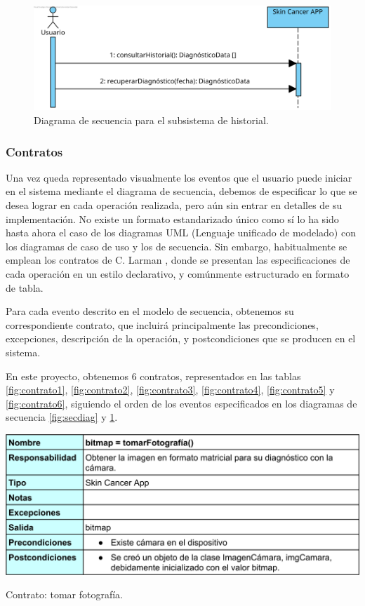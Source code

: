 \begin{figure}[H]
	\centering
	\includegraphics[scale = 1]{imagenes/DiagramaSecuenciaHistorial.png}
	\caption{Diagrama de secuencia para el subsistema de historial.}
	\label{fig:sechistorial}
\end{figure}

 \subsubsection{Contratos}
 
 Una vez queda representado visualmente los eventos que el usuario puede iniciar en el sistema mediante el diagrama de secuencia, debemos	de especificar lo que se desea lograr en cada operación realizada, pero aún sin entrar en detalles de su implementación. No existe un formato estandarizado único como sí lo ha sido hasta ahora el caso de los diagramas UML (Lenguaje unificado de modelado) con los diagramas de caso de uso y los de secuencia. Sin embargo, habitualmente se emplean los contratos de C. Larman \cite{larman2003uml}, donde se presentan las especificaciones de cada operación en un estilo declarativo, y comúnmente estructurado en formato de tabla.
 
 Para cada evento descrito en el modelo de secuencia, obtenemos su correspondiente contrato, que incluirá principalmente las precondiciones, excepciones, descripción de la operación, y postcondiciones que se producen en el sistema.
 
 En este proyecto, obtenemos 6 contratos, representados en las tablas \ref{fig:contrato1}, \ref{fig:contrato2}, \ref{fig:contrato3}, \ref{fig:contrato4}, \ref{fig:contrato5} y \ref{fig:contrato6}, siguiendo el orden de los eventos especificados en los diagramas de secuencia \ref{fig:secdiag} y \ref{fig:sechistorial}.
 
 \begin{table}[H]
 	\centering
 	\includegraphics[scale = 0.16]{imagenes/contrato1.png}
 	\caption{Contrato: tomar fotografía.}
 	\label{fig:contrato1}
 \end{table}
 
